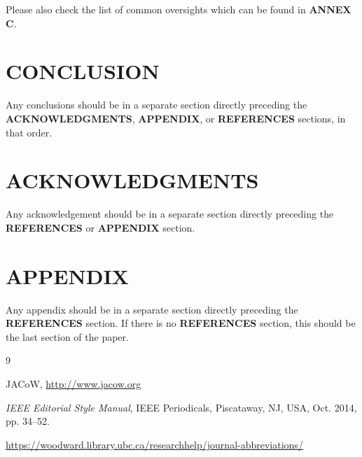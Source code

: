 \documentclass[letterpaper,
               nospread,     %
               ]{jacow}
\begin{document}
Please also check the list of common oversights which can be found in \textbf{ANNEX C}.

\flushcolsend
\section{CONCLUSION}

Any conclusions should be in a separate section directly preceding
the \textbf{ACKNOWLEDGMENTS}, \textbf{APPENDIX}, or \textbf{REFERENCES} sections, in that
order.

\section{ACKNOWLEDGMENTS}
Any acknowledgement should be in a separate section directly preceding
the \textbf{REFERENCES} or \textbf{APPENDIX} section.


\section{APPENDIX}
Any appendix should be in a separate section directly preceding
the \textbf{REFERENCES} section. If there is no \textbf{REFERENCES} section,
this should be the last section of the paper.

%
%
%
	{\printbibliography}%
	{%
	
	\begin{thebibliography}{9} %
	
		JACoW,
		\url{http://www.jacow.org}
	
		\textit{IEEE Editorial Style Manual},
		IEEE Periodicals, Piscataway,
		NJ, USA, Oct. 2014, pp. 34--52.

	\url{https://woodward.library.ubc.ca/researchhelp/journal-abbreviations/}

	\end{thebibliography}
} %
%
% 

\end{document}
